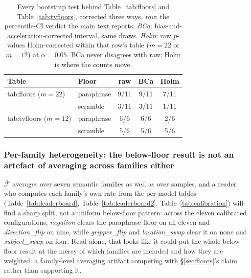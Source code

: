 \begin{table}[t]
\centering\small
\caption{Every bootstrap test behind Table~\ref{tab:floors} and Table~\ref{tab:tvfloors}, corrected three ways. \emph{raw}: the percentile-CI verdict the main text reports. \emph{BCa}: bias-and-acceleration-corrected interval, same draws. \emph{Holm}: raw $p$-values Holm-corrected within that row's table ($m{=}22$ or $m{=}12$) at $\alpha{=}0.05$. BCa never disagrees with raw; Holm is where the counts move.}
\label{tab:multiplicity}
\begin{tabular}{llccc}
\toprule
Table & Floor & raw & BCa & Holm \\
\midrule
tab:floors ($m{=}22$)    & paraphrase & 9/11 & 9/11 & 7/11 \\
                          & scramble   & 3/11 & 3/11 & 1/11 \\
tab:tvfloors ($m{=}12$)  & paraphrase & 6/6  & 6/6  & 2/6  \\
                          & scramble   & 5/6  & 5/6  & 5/6  \\
\bottomrule
\end{tabular}
\end{table}

\subsubsection{Per-family heterogeneity: the below-floor result is not an artefact of averaging across families either}
\label{sec:family_heterogeneity}

$\bar{\mathcal{F}}$ averages over seven semantic families as well as over samples, and a reader who computes each family's own rate from the per-model tables (Table~\ref{tab:leaderboard}, Table~\ref{tab:leaderboard2}, Table~\ref{tab:calibration}) will find a sharp split, not a uniform below-floor pattern: across the eleven calibrated configurations, \emph{negation} clears the paraphrase floor on all eleven and \emph{direction\_flip} on nine, while \emph{gripper\_flip} and \emph{location\_swap} clear it on none and \emph{subject\_swap} on four. Read alone, that looks like it could put the whole below-floor result at the mercy of which families are included and how they are weighted: a family-level averaging artifact competing with \S\ref{sec:floors}'s claim rather than supporting it.

